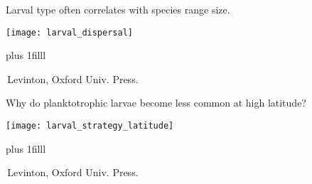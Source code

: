 \documentclass[t,handout]{beamer}  %
\begin{document}
\begin{frame}[t]{Larval type often correlates with species range size.}

\texttt{[image: larval\_dispersal]}

\vskip0pt plus 1filll

\tiny \textcopyright\,Levinton, Oxford Univ. Press.
\end{frame}

\begin{frame}[t]{Why do planktotrophic larvae become less common at high latitude?}

\texttt{[image: larval\_strategy\_latitude]}

\vskip0pt plus 1filll

\tiny \textcopyright\,Levinton, Oxford Univ. Press.
\end{frame}
\end{document}
